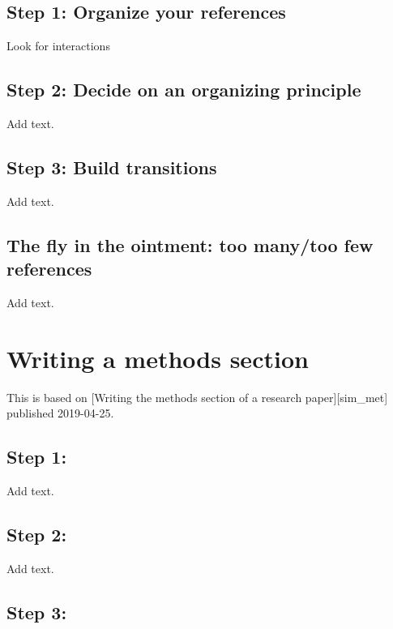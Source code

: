 \documentclass[
  letterpaper,
  DIV=11,
  numbers=noendperiod]{scrreprt}
\begin{document}
\section{Step 1: Organize your
references}\label{step-1-organize-your-references}

Look for interactions

\section{Step 2: Decide on an organizing
principle}\label{step-2-decide-on-an-organizing-principle}

Add text.

\section{Step 3: Build transitions}\label{step-3-build-transitions}

Add text.

\section{The fly in the ointment: too many/too few
references}\label{the-fly-in-the-ointment-too-manytoo-few-references}

Add text.


\chapter{Writing a methods section}\label{writing-a-methods-section}

This is based on {[}Writing the methods section of a research
paper{]}{[}sim\_met{]} published 2019-04-25.

\section{Step 1:}\label{step-1}

Add text.

\section{Step 2:}\label{step-2}

Add text.

\section{Step 3:}\label{step-3}
\end{document}
